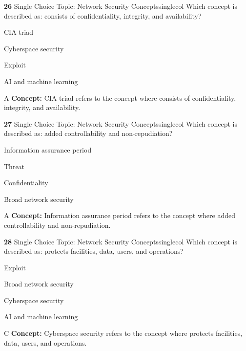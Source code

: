\documentclass[10pt,a4paper]{article}
\begin{document}
\begin{qcard}{\color{white}\textbf{26} \hfill \small Single Choice \textbar{} Topic: Network Security Concepts}{singlecol}
Which concept is described as: consists of confidentiality, integrity, and availability?

\begin{qoptions}
\item CIA triad
\item Cyberspace security
\item Exploit
\item AI and machine learning
\end{qoptions}
\begin{explainbox}{A}
\textbf{Concept:} CIA triad refers to the concept where consists of confidentiality, integrity, and availability.
\end{explainbox}
\end{qcard}

\begin{qcard}{\color{white}\textbf{27} \hfill \small Single Choice \textbar{} Topic: Network Security Concepts}{singlecol}
Which concept is described as: added controllability and non-repudiation?

\begin{qoptions}
\item Information assurance period
\item Threat
\item Confidentiality
\item Broad network security
\end{qoptions}
\begin{explainbox}{A}
\textbf{Concept:} Information assurance period refers to the concept where added controllability and non-repudiation.
\end{explainbox}
\end{qcard}

\begin{qcard}{\color{white}\textbf{28} \hfill \small Single Choice \textbar{} Topic: Network Security Concepts}{singlecol}
Which concept is described as: protects facilities, data, users, and operations?

\begin{qoptions}
\item Exploit
\item Broad network security
\item Cyberspace security
\item AI and machine learning
\end{qoptions}
\begin{explainbox}{C}
\textbf{Concept:} Cyberspace security refers to the concept where protects facilities, data, users, and operations.
\end{explainbox}
\end{qcard}
\end{document}
